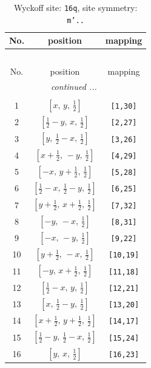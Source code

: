 \documentclass[fleqn,8pt]{jsarticle}
\begin{document}
\renewcommand{\arraystretch}{1.2}
\begin{longtable}{ccc}
\caption{Wyckoff site: {\tt 16q}, site symmetry: {\tt m'..}}
 \\
 \hline \hline
No. & position & mapping \\ \hline \endfirsthead

\multicolumn{2}{l}{\tablename\ \thetable{}} \\
 \hline \hline
No. & position & mapping \\ \hline \endhead

 \hline \hline
\multicolumn{2}{r}{\footnotesize\it continued ...} \\ \endfoot

 \hline \hline
\multicolumn{2}{r}{} \\ \endlastfoot

1 & $\left[ x,\, y,\, \frac{1}{2} \right]$ & {\tt [1,30]} \\ \hline
2 & $\left[ \frac{1}{2} - y,\, x,\, \frac{1}{2} \right]$ & {\tt [2,27]} \\ \hline
3 & $\left[ y,\, \frac{1}{2} - x,\, \frac{1}{2} \right]$ & {\tt [3,26]} \\ \hline
4 & $\left[ x + \frac{1}{2},\, - y,\, \frac{1}{2} \right]$ & {\tt [4,29]} \\ \hline
5 & $\left[ - x,\, y + \frac{1}{2},\, \frac{1}{2} \right]$ & {\tt [5,28]} \\ \hline
6 & $\left[ \frac{1}{2} - x,\, \frac{1}{2} - y,\, \frac{1}{2} \right]$ & {\tt [6,25]} \\ \hline
7 & $\left[ y + \frac{1}{2},\, x + \frac{1}{2},\, \frac{1}{2} \right]$ & {\tt [7,32]} \\ \hline
8 & $\left[ - y,\, - x,\, \frac{1}{2} \right]$ & {\tt [8,31]} \\ \hline
9 & $\left[ - x,\, - y,\, \frac{1}{2} \right]$ & {\tt [9,22]} \\ \hline
10 & $\left[ y + \frac{1}{2},\, - x,\, \frac{1}{2} \right]$ & {\tt [10,19]} \\ \hline
11 & $\left[ - y,\, x + \frac{1}{2},\, \frac{1}{2} \right]$ & {\tt [11,18]} \\ \hline
12 & $\left[ \frac{1}{2} - x,\, y,\, \frac{1}{2} \right]$ & {\tt [12,21]} \\ \hline
13 & $\left[ x,\, \frac{1}{2} - y,\, \frac{1}{2} \right]$ & {\tt [13,20]} \\ \hline
14 & $\left[ x + \frac{1}{2},\, y + \frac{1}{2},\, \frac{1}{2} \right]$ & {\tt [14,17]} \\ \hline
15 & $\left[ \frac{1}{2} - y,\, \frac{1}{2} - x,\, \frac{1}{2} \right]$ & {\tt [15,24]} \\ \hline
16 & $\left[ y,\, x,\, \frac{1}{2} \right]$ & {\tt [16,23]} \\
\end{longtable}
\end{document}
